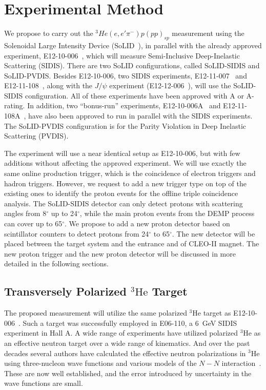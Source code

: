 \section{Experimental Method}

We propose to carry out the $^3He(e,e'\pi^-)p(pp)_{sp}$ measurement using the
Solenoidal Large Intensity Device (SoLID~\cite{solid_pcdr}), in parallel with
the already approved experiment, E12-10-006~\cite{solid:e12-10-006}, which will
measure Semi-Inclusive Deep-Inelastic Scattering (SIDIS). There are two SoLID
configurations, called SoLID-SIDIS and SoLID-PVDIS. Besides E12-10-006, two
SIDIS experiments, E12-11-007~\cite{solid:e12-11-007} and
E12-11-108~\cite{solid:e12-11-108}, along with the $J/\psi$ experiment
(E12-12-006~\cite{solid:e12-12-006}), will use the SoLID-SIDIS
configuration. All of these experiments have been approved with A or A-
rating. In addition, two ``bonus-run'' experiments,
E12-10-006A~\cite{solid:e12-10-006A} and E12-11-108A~\cite{solid:e12-11-108A},
have also been approved to run in parallel with the SIDIS experiments. The
SoLID-PVDIS configuration is for the Parity Violation in Deep Inelastic
Scattering (PVDIS).

The experiment will use a near identical setup as E12-10-006, but with few
additions without affecting the approved experiment. We will use exactly the
same online production trigger, which is the coincidence of electron triggers
and hadron triggers. However, we request to add a new trigger type on top of
the existing ones to identify the proton events for the offline triple
coincidence analysis. The SoLID-SIDIS detector can only detect protons with
scattering angles from 8$^{\circ}$ up to 24$^{\circ}$, while the main proton
events from the DEMP process can cover up to 65$^{\circ}$. We propose to add a
new proton detector based on scintillator counters to detect protons from
24$^{\circ}$ to 65$^{\circ}$. The new detector will be placed between the
target system and the entrance and of CLEO-II magnet. The new proton trigger
and the new proton detector will be discussed in more detailed in the following
sections.

\subsection {Transversely Polarized $\mathrm{^{3}He}$ Target}

The proposed measurement will utilize the same polarized $\mathrm{^{3}He}$
target as E12-10-006~\cite{e12-10-006}. Such a target was successfully employed
in E06-110, a 6~GeV SIDIS experiment in Hall A. 
A wide range of experiments have utilized polarized $^3$He as an effective
neutron target over a wide range of kinematics. And over the past decades
several authors have calculated the effective neutron polarizations in $^3$He
using three-nucleon wave functions and various models of the $N-N$
interaction~\cite{3hepol1}.  These are now well established, and the error
introduced by uncertainty in the wave functions are small.

